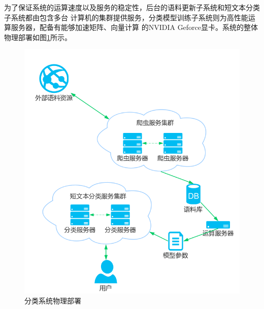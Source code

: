 为了保证系统的运算速度以及服务的稳定性，后台的语料更新子系统和短文本分类子系统都由包含多台
计算机的集群提供服务，分类模型训练子系统则为高性能运算服务器，配备有能够加速矩阵、向量计算
的NVIDIA Geforce显卡。系统的整体物理部署如图\ref{system_deployment}所示。
\begin{figure}[h]
    \includegraphics[scale=0.45]{picture/system_deployment.png}
    \caption{分类系统物理部署}
    \label{system_deployment}
\end{figure}
